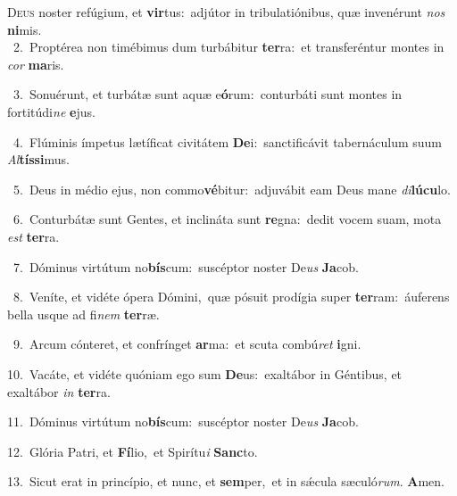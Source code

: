 \lettrine{\initial\textcolor{\initialcolor}{D}}{eus} noster refúgium, et \textbf{vir}\-tus:~\star adjútor in tribulatiónibus, quæ invenérunt \textit{nos} \textbf{ni}\-mis.\\
{\numbfont\textcolor{\numbcolor}{~2.}}~Proptérea non timébimus dum turbábitur \textbf{ter}\-ra:~\star et transferéntur montes in \textit{cor} \textbf{ma}\-ris.\par
{\numbfont\textcolor{\numbcolor}{~3.}}~Sonuérunt, et turbátæ sunt aquæ e\-\textbf{ó}\-rum:~\star conturbáti sunt montes in fortitúdi\textit{ne} \textbf{e}\-jus.\par
{\numbfont\textcolor{\numbcolor}{~4.}}~Flúminis ímpetus lætíficat civitátem \textbf{De}\-i:~\star sanctificávit tabernáculum suum \textit{Al}\-\textbf{tís}\textbf{si}mus.\par
{\numbfont\textcolor{\numbcolor}{~5.}}~Deus in médio ejus, non commo\-\textbf{vé}\-bitur:~\star adjuvábit eam Deus mane \textit{di}\-\textbf{lú}\textbf{cu}lo.\par
{\numbfont\textcolor{\numbcolor}{~6.}}~Conturbátæ sunt Gentes, et inclináta sunt \textbf{re}\-gna:~\star dedit vocem suam, mota \textit{est} \textbf{ter}\-ra.\par
{\numbfont\textcolor{\numbcolor}{~7.}}~Dóminus virtútum no\-\textbf{bís}\-cum:~\star suscéptor noster De\textit{us} \textbf{Ja}\-cob.\par
{\numbfont\textcolor{\numbcolor}{~8.}}~Veníte, et vidéte ópera Dómini,~\dagger quæ pósuit prodígia super \textbf{ter}\-ram:~\star áuferens bella usque ad fi\textit{nem} \textbf{ter}\-ræ.\par
{\numbfont\textcolor{\numbcolor}{~9.}}~Arcum cónteret, et confrínget \textbf{ar}\-ma:~\star et scuta combú\textit{ret} \textbf{i}\-gni.\par
{\numbfont\textcolor{\numbcolor}{10.}}~Vacáte, et vidéte quóniam ego sum \textbf{De}\-us:~\star exaltábor in Géntibus, et exaltábor \textit{in} \textbf{ter}\-ra.\par
{\numbfont\textcolor{\numbcolor}{11.}}~Dóminus virtútum no\-\textbf{bís}\-cum:~\star suscéptor noster De\textit{us} \textbf{Ja}\-cob.\par
{\numbfont\textcolor{\numbcolor}{12.}}~Glória Patri, et \textbf{Fí}\-lio,~\star et Spirítu\textit{i} \textbf{Sanc}\-to.\par
{\numbfont\textcolor{\numbcolor}{13.}}~Sicut erat in princípio, et nunc, et \textbf{sem}\-per,~\star et in sǽcula sæculó\-\textit{rum}\-. \textbf{A}\-men.\par
